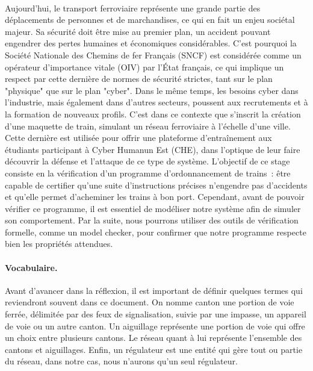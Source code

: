 \documentclass[oneside, a4paper, 11pt]{book}
\begin{document}
\paragraph{}
Aujourd'hui, le transport ferroviaire représente une grande partie des déplacements de personnes et de marchandises, ce qui en fait un enjeu sociétal majeur.
Sa sécurité doit être mise au premier plan, un accident pouvant engendrer des pertes humaines et économiques considérables. C'est pourquoi la Société Nationale des Chemins de fer Français (SNCF) est considérée comme un opérateur d'importance vitale (OIV) par l'État français, ce qui implique un respect par cette dernière de normes de sécurité strictes, tant sur le plan "physique" que sur le plan "cyber". 
Dans le même temps, les besoins cyber dans l'industrie, mais également dans d'autres secteurs, poussent aux recrutements et à la formation de nouveaux profils.
C'est dans ce contexte que s'inscrit la création d'une maquette de train, simulant un réseau ferroviaire à l'échelle d'une ville. Cette dernière est utilisée pour offrir une plateforme d'entraînement aux étudiants participant à Cyber Humanun Est (CHE), dans l'optique de leur faire découvrir la défense et l'attaque de ce type de système.
L'objectif de ce stage consiste en la vérification d'un programme d'ordonnancement de trains~: être capable de certifier qu'une suite d'instructions précises n'engendre pas d'accidents et qu'elle permet d'acheminer les trains à bon port.
Cependant, avant de pouvoir vérifier ce programme, il est essentiel de modéliser notre système afin de simuler son comportement. Par la suite, nous pourrons utiliser des outils de vérification formelle, comme un model checker, pour confirmer que notre programme respecte bien les propriétés attendues.

\paragraph{Vocabulaire.}
Avant d'avancer dans la réflexion, il est important de définir quelques termes qui reviendront souvent dans ce document. On nomme canton une portion de voie ferrée, délimitée par des feux de signalisation, suivie par une impasse, un appareil de voie ou un autre canton. 
Un aiguillage représente une portion de voie qui offre un choix entre plusieurs cantons. Le réseau quant à lui représente l'ensemble des cantons et aiguillages. Enfin, un régulateur est une entité qui gère tout ou partie du réseau, dans notre cas, nous n'aurons qu'un seul régulateur. 
\end{document}

